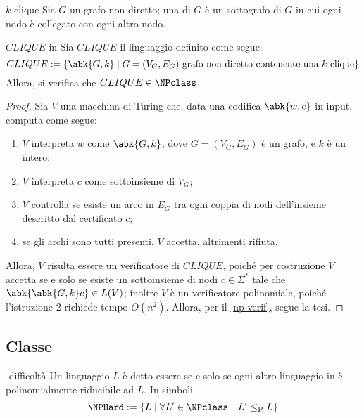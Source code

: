 \documentclass[a4paper, 12pt]{report}
\begin{document}
    \begin{frameddefn}{$k$-clique}
        Sia $G$ un grafo non diretto; una  di $G$ è un sottografo di $G$ in cui ogni nodo è collegato con ogni altro nodo.
    \end{frameddefn}

    \begin{framedthm}[label={clique in np}]{$CLIQUE$ in \NPclass}
        Sia $CLIQUE$ il linguaggio definito come segue: $$CLIQUE := \{\abk{G, k} \mid G = (V_G, E_G) \ \textrm{grafo non diretto contenente una $k$-clique}\}$$ Allora, si verifica che $CLIQUE \in \NPclass$.
    \end{framedthm}

    \begin{proof}
        Sia $V$ una macchina di Turing che, data una codifica $\abk{w, c}$ in input, computa come segue:

        \begin{enumerate}
            \item $V$ interpreta $w$ come $\abk{G, k}$, dove $G = (V_G, E_G)$ è un grafo, e $k$ è un intero;
            \item $V$ interpreta $c$ come sottoinsieme di $V_G$;
            \item $V$ controlla se esiste un arco in $E_G$ tra ogni coppia di nodi dell'insieme descritto dal certificato $c$;
            \item se gli archi sono tutti presenti, $V$ accetta, altrimenti rifiuta.
        \end{enumerate}

        Allora, $V$ risulta essere un verificatore di $CLIQUE$, poiché per costruzione $V$ accetta se e solo se esiste un sottoinsieme di nodi $c \in \Sigma^*$ tale che $\abk{\abk{G, k} c} \in L(V)$; inoltre $V$ è un verificatore polinomiale, poiché l'istruzione 2 richiede tempo $O(n^2)$. Allora, per il \cref{np verif}, segue la tesi.
    \end{proof}

    \subsection{Classe \NPComplete}

    \begin{frameddefn}{\NPclass-difficoltà}
        Un linguaggio $L$ è detto essere  se e solo se ogni altro linguaggio in \NPclass è polinomialmente riducibile ad $L$. In simboli $$\NPHard := \{L \mid \forall L' \in \NPclass \quad L' \leq_\mathrm P L\}$$
    \end{frameddefn}
\end{document}
